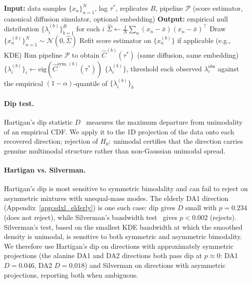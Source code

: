 \documentclass{article}
\begin{document}
\begin{algorithm}[H]
\caption{Operational Noise Floor via Matched-Pipeline Monte Carlo}
\label{alg:operational_floor}
\begin{algorithmic}[1]
 
\State \textbf{Input:} data samples $\{x_n\}_{n=1}^N$, lag $\tau^*$, replicates $B$, pipeline $\mathcal{P}$ (score estimator, canonical diffusion simulator, optional embedding)
\State \textbf{Output:} empirical null distribution $\{\lambda_i^{(b)}\}_{b=1}^B$ for each $i$
\State $\hat\Sigma \gets \tfrac{1}{N}\sum_n (x_n - \bar x)(x_n - \bar x)^\top$ 
    \State Draw $\{x_n^{(b)}\}_{n=1}^N \sim \mathcal{N}(0, \hat\Sigma)$ 
    \State Refit score estimator on $\{x_n^{(b)}\}$ if applicable (e.g., KDE)
    \State Run pipeline $\mathcal{P}$ to obtain $\hat C^{(b)}(\tau^*)$ (same diffusion, same embedding)
    \State $\{\lambda_i^{(b)}\}_i \gets \mathrm{eig}(\hat C^{\mathrm{sym},(b)}(\tau^*))$
\EndFor
\State \Return $\{\lambda_i^{(b)}\}$, threshold each observed $\lambda_i^{\mathrm{obs}}$ against the empirical $(1-\alpha)$-quantile of $\{\lambda_i^{(b)}\}_b$
\end{algorithmic}
\end{algorithm}

\paragraph{Dip test.}
Hartigan's dip statistic $D$~\cite{hartigan1985} measures the maximum departure from unimodality of an empirical CDF. We apply it to the 1D projection of the data onto each recovered direction; rejection of $H_0:\ \mathrm{unimodal}$ certifies that the direction carries genuine multimodal structure rather than non-Gaussian unimodal spread.

\paragraph{Hartigan vs. Silverman.}
Hartigan's dip is most sensitive to symmetric bimodality and can
fail to reject on asymmetric mixtures with unequal-mass modes. The
elderly DA1 direction (Appendix~\ref{app:sdxl_elderly}) is one such
case: dip gives $D$ small with $p = 0.234$ (does not reject), while
Silverman's bandwidth test~\cite{silverman1981} gives $p < 0.002$
(rejects). Silverman's test, based on the smallest KDE bandwidth at
which the smoothed density is unimodal, is sensitive to both
symmetric and asymmetric bimodality. We therefore use Hartigan's
dip on directions with approximately symmetric projections (the
alanine DA1 and DA2 directions both pass dip at $p \approx 0$:
DA1 $D = 0.046$, DA2 $D = 0.018$) and Silverman on directions with
asymmetric projections, reporting both when ambiguous.
\end{document}
